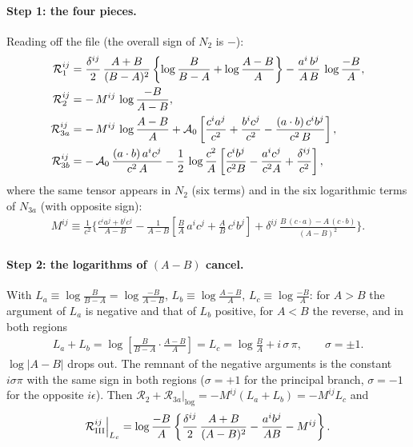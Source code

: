 \documentclass[10pt]{article}
\numberwithin{equation}{section}
\begin{document}
\paragraph{Step 1: the four pieces.} Reading off the file (the overall sign of $N_{2}$ is $-$):
\begin{align}
\mathcal{R}^{ij}_{1}&=\frac{\delta^{ij}}{2}\,\frac{A+B}{(B-A)^{2}}\left\{\log\frac{B}{B-A}+\log\frac{A-B}{A}\right\}-\frac{a^{i}\,b^{j}}{A\,B}\,\log\frac{-B}{A},\notag\\
\mathcal{R}^{ij}_{2}&=-\,M^{ij}\,\log\frac{-B}{A-B},\notag\\
\mathcal{R}^{ij}_{3a}&=-\,M^{ij}\,\log\frac{A-B}{A}
+\mathcal{A}_{0}\left[\frac{c^{i}a^{j}}{c^{2}}+\frac{b^{i}c^{j}}{c^{2}}-\frac{(a\cdot b)\,c^{i}b^{j}}{c^{2}\,B}\right],\notag\\
\mathcal{R}^{ij}_{3b}&=-\,\mathcal{A}_{0}\,\frac{(a\cdot b)\,a^{i}c^{j}}{c^{2}\,A}
-\frac12\,\log\frac{c^{2}}{A}\left[\frac{c^{i}b^{j}}{c^{2}B}-\frac{a^{i}c^{j}}{c^{2}A}+\frac{\delta^{ij}}{c^{2}}\right],
\end{align}
where the same tensor appears in $N_{2}$ (six terms) and in the six logarithmic terms of $N_{3a}$ (with opposite sign):
\begin{align}
M^{ij}\equiv\frac{1}{c^{2}}\Bigg\{\frac{c^{i}a^{j}+b^{i}c^{j}}{A-B}-\frac{1}{A-B}\left[\frac{B}{A}\,a^{i}c^{j}+\frac{A}{B}\,c^{i}b^{j}\right]
+\delta^{ij}\,\frac{B\,(c\cdot a)-A\,(c\cdot b)}{(A-B)^{2}}\Bigg\}.
\end{align}

\paragraph{Step 2: the logarithms of $(A-B)$ cancel.} With
$L_{a}\equiv\log\frac{B}{B-A}=\log\frac{-B}{A-B}$, $L_{b}\equiv\log\frac{A-B}{A}$, $L_{c}\equiv\log\frac{-B}{A}$:
for $A>B$ the argument of $L_{a}$ is negative and that of $L_{b}$ positive, for $A<B$ the reverse, and in both regions
\begin{align}
L_{a}+L_{b}=\log\left[\frac{B}{B-A}\cdot\frac{A-B}{A}\right]=L_{c}=\log\frac{B}{A}+i\,\sigma\,\pi ,\qquad\sigma=\pm1. \label{eq:logsum}
\end{align}
$\log|A-B|$ drops out. The remnant of the negative arguments is the constant $i\sigma\pi$ with the same sign in both regions ($\sigma=+1$ for the principal branch, $\sigma=-1$ for the opposite $i\epsilon$). Then $\mathcal{R}_{2}+\mathcal{R}_{3a}|_{\log}=-M^{ij}(L_{a}+L_{b})=-M^{ij}L_{c}$ and
\begin{align}
\mathcal{R}_{\rm III}^{ij}\Big|_{L_{c}}=\log\frac{-B}{A}\left\{\frac{\delta^{ij}}{2}\,\frac{A+B}{(A-B)^{2}}-\frac{a^{i}b^{j}}{AB}-M^{ij}\right\}.
\end{align}
\end{document}
